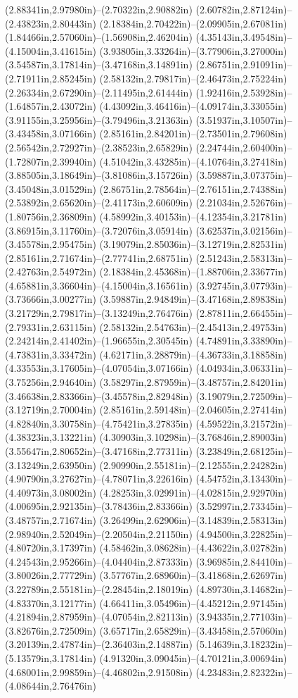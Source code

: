 (2.88341in,2.97980in)--(2.70322in,2.90882in) (2.60782in,2.87124in)--(2.43823in,2.80443in) (2.18384in,2.70422in)--(2.09905in,2.67081in) (1.84466in,2.57060in)--(1.56908in,2.46204in) (4.35143in,3.49548in)--(4.15004in,3.41615in) (3.93805in,3.33264in)--(3.77906in,3.27000in) (3.54587in,3.17814in)--(3.47168in,3.14891in) (2.86751in,2.91091in)--(2.71911in,2.85245in) (2.58132in,2.79817in)--(2.46473in,2.75224in) (2.26334in,2.67290in)--(2.11495in,2.61444in) (1.92416in,2.53928in)--(1.64857in,2.43072in) (4.43092in,3.46416in)--(4.09174in,3.33055in) (3.91155in,3.25956in)--(3.79496in,3.21363in) (3.51937in,3.10507in)--(3.43458in,3.07166in) (2.85161in,2.84201in)--(2.73501in,2.79608in) (2.56542in,2.72927in)--(2.38523in,2.65829in) (2.24744in,2.60400in)--(1.72807in,2.39940in) (4.51042in,3.43285in)--(4.10764in,3.27418in) (3.88505in,3.18649in)--(3.81086in,3.15726in) (3.59887in,3.07375in)--(3.45048in,3.01529in) (2.86751in,2.78564in)--(2.76151in,2.74388in) (2.53892in,2.65620in)--(2.41173in,2.60609in) (2.21034in,2.52676in)--(1.80756in,2.36809in) (4.58992in,3.40153in)--(4.12354in,3.21781in) (3.86915in,3.11760in)--(3.72076in,3.05914in) (3.62537in,3.02156in)--(3.45578in,2.95475in) (3.19079in,2.85036in)--(3.12719in,2.82531in) (2.85161in,2.71674in)--(2.77741in,2.68751in) (2.51243in,2.58313in)--(2.42763in,2.54972in) (2.18384in,2.45368in)--(1.88706in,2.33677in) (4.65881in,3.36604in)--(4.15004in,3.16561in) (3.92745in,3.07793in)--(3.73666in,3.00277in) (3.59887in,2.94849in)--(3.47168in,2.89838in) (3.21729in,2.79817in)--(3.13249in,2.76476in) (2.87811in,2.66455in)--(2.79331in,2.63115in) (2.58132in,2.54763in)--(2.45413in,2.49753in) (2.24214in,2.41402in)--(1.96655in,2.30545in) (4.74891in,3.33890in)--(4.73831in,3.33472in) (4.62171in,3.28879in)--(4.36733in,3.18858in) (4.33553in,3.17605in)--(4.07054in,3.07166in) (4.04934in,3.06331in)--(3.75256in,2.94640in) (3.58297in,2.87959in)--(3.48757in,2.84201in) (3.46638in,2.83366in)--(3.45578in,2.82948in) (3.19079in,2.72509in)--(3.12719in,2.70004in) (2.85161in,2.59148in)--(2.04605in,2.27414in) (4.82840in,3.30758in)--(4.75421in,3.27835in) (4.59522in,3.21572in)--(4.38323in,3.13221in) (4.30903in,3.10298in)--(3.76846in,2.89003in) (3.55647in,2.80652in)--(3.47168in,2.77311in) (3.23849in,2.68125in)--(3.13249in,2.63950in) (2.90990in,2.55181in)--(2.12555in,2.24282in) (4.90790in,3.27627in)--(4.78071in,3.22616in) (4.54752in,3.13430in)--(4.40973in,3.08002in) (4.28253in,3.02991in)--(4.02815in,2.92970in) (4.00695in,2.92135in)--(3.78436in,2.83366in) (3.52997in,2.73345in)--(3.48757in,2.71674in) (3.26499in,2.62906in)--(3.14839in,2.58313in) (2.98940in,2.52049in)--(2.20504in,2.21150in) (4.94500in,3.22825in)--(4.80720in,3.17397in) (4.58462in,3.08628in)--(4.43622in,3.02782in) (4.24543in,2.95266in)--(4.04404in,2.87333in) (3.96985in,2.84410in)--(3.80026in,2.77729in) (3.57767in,2.68960in)--(3.41868in,2.62697in) (3.22789in,2.55181in)--(2.28454in,2.18019in) (4.89730in,3.14682in)--(4.83370in,3.12177in) (4.66411in,3.05496in)--(4.45212in,2.97145in) (4.21894in,2.87959in)--(4.07054in,2.82113in) (3.94335in,2.77103in)--(3.82676in,2.72509in) (3.65717in,2.65829in)--(3.43458in,2.57060in) (3.20139in,2.47874in)--(2.36403in,2.14887in) (5.14639in,3.18232in)--(5.13579in,3.17814in) (4.91320in,3.09045in)--(4.70121in,3.00694in) (4.68001in,2.99859in)--(4.46802in,2.91508in) (4.23483in,2.82322in)--(4.08644in,2.76476in) 